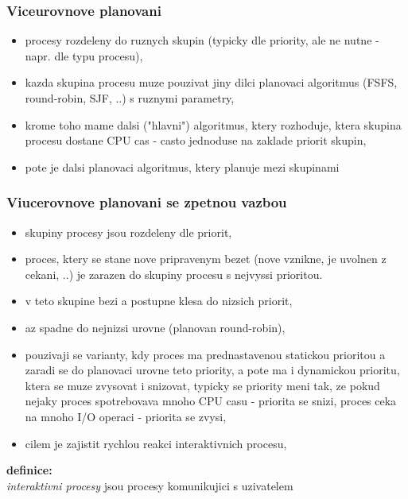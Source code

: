 \documentclass[a4paper, 11pt]{article}
\begin{document}
\subsubsection{Viceurovnove planovani}
\begin{itemize}
    \item procesy rozdeleny do ruznych skupin (typicky dle priority, ale ne nutne - napr. dle typu procesu),
    \item kazda skupina procesu muze pouzivat jiny dilci planovaci algoritmus (FSFS, round-robin, SJF, ..) s ruznymi parametry,
    \item krome toho mame dalsi ("hlavni") algoritmus, ktery rozhoduje, ktera skupina procesu dostane CPU cas - casto jednoduse na zaklade priorit skupin,
    \item pote je dalsi planovaci algoritmus, ktery planuje mezi skupinami \\
\end{itemize}

\subsubsection{Viucerovnove planovani se zpetnou vazbou}
\begin{itemize}
    \item skupiny procesy jsou rozdeleny dle priorit,
    \item proces, ktery se stane nove pripravenym bezet (nove vznikne, je uvolnen z cekani, ..) je zarazen do skupiny procesu s nejvyssi prioritou.
    \item v teto skupine bezi a postupne klesa do nizsich priorit,
    \item az spadne do nejnizsi urovne (planovan round-robin),
    \item pouzivaji se varianty, kdy proces ma prednastavenou statickou prioritou a zaradi se do planovaci urovne teto priority, a pote ma i dynamickou prioritu, ktera se muze zvysovat i snizovat, typicky se priority meni tak, ze pokud nejaky proces spotrebovava mnoho CPU casu - priorita se snizi, proces ceka na mnoho I/O operaci - priorita se zvysi,
    \item cilem je zajistit rychlou reakci interaktivnich procesu, \\
\end{itemize}

\textbf{definice:} \\[0.5em]
\textit{interaktivni procesy} jsou procesy komunikujici s uzivatelem \\ 
\end{document}
